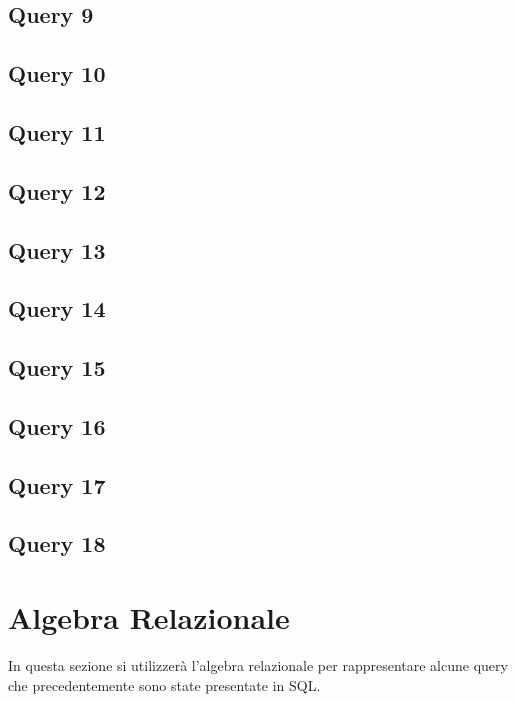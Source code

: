 \documentclass[12pt,a4paper]{article}
\begin{document}
\subsection{Query 9}

\newpage
\subsection{Query 10}

\subsection{Query 11}

\subsection{Query 12}

\subsection{Query 13}

\subsection{Query 14}

\subsection{Query 15}

\newpage
\subsection{Query 16}

\subsection{Query 17}

\subsection{Query 18}

\newpage
\section{Algebra Relazionale}
In questa sezione si utilizzerà l'algebra relazionale per rappresentare alcune query che precedentemente sono state presentate in SQL.
\end{document}
